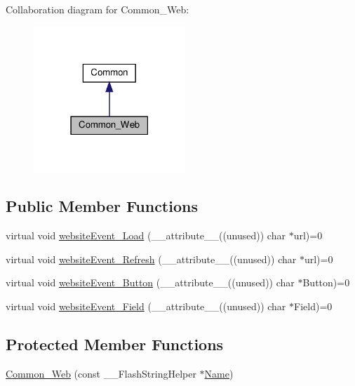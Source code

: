 Collaboration diagram for Common\+\_\+\+Web\+:
\nopagebreak
\begin{figure}[H]
\begin{center}
\leavevmode
\includegraphics[width=162pt]{class_common___web__coll__graph}
\end{center}
\end{figure}
\subsection*{Public Member Functions}
\begin{DoxyCompactItemize}
\item 
virtual void \hyperlink{class_common___web_a5ce0d5ce6f63279c3b624371d8a76211}{website\+Event\+\_\+\+Load} (\+\_\+\+\_\+attribute\+\_\+\+\_\+((unused)) char $\ast$url)=0
\item 
virtual void \hyperlink{class_common___web_aaca7c54fdcf908e4e1256b7b1f6fc212}{website\+Event\+\_\+\+Refresh} (\+\_\+\+\_\+attribute\+\_\+\+\_\+((unused)) char $\ast$url)=0
\item 
virtual void \hyperlink{class_common___web_acd10f27b30f3111277b4730ee5495090}{website\+Event\+\_\+\+Button} (\+\_\+\+\_\+attribute\+\_\+\+\_\+((unused)) char $\ast$Button)=0
\item 
virtual void \hyperlink{class_common___web_a898e3fd8cc6384ecbbbd79c8a3a13b62}{website\+Event\+\_\+\+Field} (\+\_\+\+\_\+attribute\+\_\+\+\_\+((unused)) char $\ast$Field)=0
\end{DoxyCompactItemize}
\subsection*{Protected Member Functions}
\begin{DoxyCompactItemize}
\item 
\hyperlink{class_common___web_a01b0113c6e18ba13fa5fdf9e4b031b09}{Common\+\_\+\+Web} (const \+\_\+\+\_\+\+Flash\+String\+Helper $\ast$\hyperlink{class_common_aeea91a726dbe988e515057b32ba0726f}{Name})
\end{DoxyCompactItemize}
